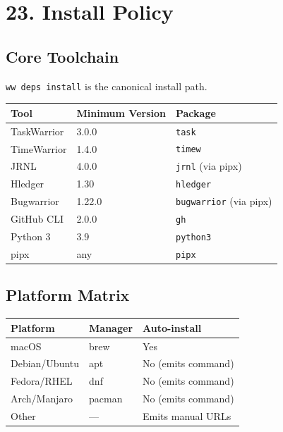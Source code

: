 \documentclass[
]{article}
\newcounter{none} %
\begin{document}
\section{23. Install Policy}\label{install-policy}

\subsection{Core Toolchain}\label{core-toolchain}

\texttt{ww\ deps\ install} is the canonical install path.

{\def\LTcaptype{none} %
\begin{longtable}[]{@{}lll@{}}
\toprule\noalign{}
Tool & Minimum Version & Package \\
\midrule\noalign{}
\endhead
\bottomrule\noalign{}
\endlastfoot
TaskWarrior & 3.0.0 & \texttt{task} \\
TimeWarrior & 1.4.0 & \texttt{timew} \\
JRNL & 4.0.0 & \texttt{jrnl} (via pipx) \\
Hledger & 1.30 & \texttt{hledger} \\
Bugwarrior & 1.22.0 & \texttt{bugwarrior} (via pipx) \\
GitHub CLI & 2.0.0 & \texttt{gh} \\
Python 3 & 3.9 & \texttt{python3} \\
pipx & any & \texttt{pipx} \\
\end{longtable}
}

\subsection{Platform Matrix}\label{platform-matrix}

{\def\LTcaptype{none} %
\begin{longtable}[]{@{}lll@{}}
\toprule\noalign{}
Platform & Manager & Auto-install \\
\midrule\noalign{}
\endhead
\bottomrule\noalign{}
\endlastfoot
macOS & brew & Yes \\
Debian/Ubuntu & apt & No (emits command) \\
Fedora/RHEL & dnf & No (emits command) \\
Arch/Manjaro & pacman & No (emits command) \\
Other & --- & Emits manual URLs \\
\end{longtable}
}
\end{document}

